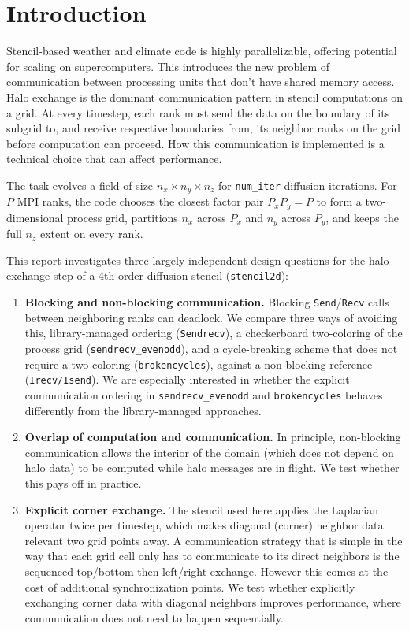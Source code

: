 \documentclass{article}
\begin{document}
\newpage
\tableofcontents
\newpage

\section{Introduction}
\label{sec:introduction}

Stencil-based weather and climate code is highly parallelizable, offering potential for scaling on supercomputers. This introduces the new problem of communication between processing units that don't have shared memory access. Halo exchange is the dominant communication pattern in stencil computations on a grid. At every timestep, each rank must send the data on the boundary of its subgrid to, and receive respective boundaries from, its neighbor ranks on the grid before computation can proceed. How this communication is implemented is a technical choice that can affect performance.

The task evolves a field of size $n_x\times n_y\times n_z$ for
\texttt{num\_iter} diffusion iterations. For $P$ MPI ranks, the code
chooses the closest factor pair $P_xP_y=P$ to form a two-dimensional
process grid, partitions $n_x$ across $P_x$ and $n_y$ across $P_y$, and
keeps the full $n_z$ extent on every rank.


This report investigates three largely independent design questions
for the halo exchange step of a 4th-order diffusion stencil
(\texttt{stencil2d}):

\begin{enumerate}
    \item \textbf{Blocking and non-blocking communication.} Blocking
    \texttt{Send}/\texttt{Recv} calls between neighboring ranks can deadlock. We compare three ways of avoiding this, library-managed ordering (\texttt{Sendrecv}), a checkerboard two-coloring of the process grid (\texttt{sendrecv\_evenodd}), and a cycle-breaking
    scheme that does not require a two-coloring (\texttt{brokencycles}), against a non-blocking reference (\texttt{Irecv/Isend}). We are especially interested in whether the explicit communication ordering in \texttt{sendrecv\_evenodd} and \texttt{brokencycles} behaves differently from the library-managed approaches.
    \item \textbf{Overlap of computation and communication.} In principle, non-blocking communication allows the interior of the domain (which does not depend on halo data) to be computed while halo messages are in flight. We test whether this pays off in practice.
    \item \textbf{Explicit corner exchange.} The stencil used here
    applies the Laplacian operator twice per timestep, which makes
    diagonal (corner) neighbor data relevant two grid points away. A communication strategy that is simple in the way that each grid cell only has to communicate to its direct neighbors is the sequenced top/bottom-then-left/right exchange. However this comes at the cost of additional synchronization points. We test whether explicitly exchanging corner data with diagonal neighbors improves performance, where communication does not need to happen sequentially.
\end{enumerate}
\end{document}
